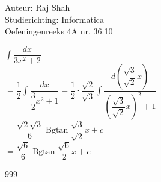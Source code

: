 \documentclass[a4paper]{article}
\begin{document}
  
\noindent \large Auteur: Raj Shah \\
\noindent \large Studierichting: Informatica\\
\noindent \large Oefeningenreeks 4A nr. 36.10\\

\medskip

\normalsize

$\displaystyle\int \dfrac{dx}{3x^2 + 2}$\\

$ = \dfrac{1}{2} \displaystyle\int \dfrac{dx}{\dfrac{3}{2}x^2 + 1} = \dfrac{1}{2} \cdot \dfrac{\sqrt{2}}{\sqrt{3}} \displaystyle\int \dfrac{d\left(\dfrac{\sqrt{3}}{\sqrt{2}}x\right)}{\left(\dfrac{\sqrt{3}}{\sqrt{2}}x\right)^2 + 1}$\\

$ = \dfrac{\sqrt{2}\sqrt{3}}{6} \operatorname{Bgtan}\dfrac{\sqrt{3}}{\sqrt{2}}x + c$\\

$ = \dfrac{\sqrt{6}}{6} \operatorname{Bgtan} \dfrac{\sqrt{6}}{2}x + c$\\







\begin{thebibliography}{999}
\end{thebibliography}
\end{document}
